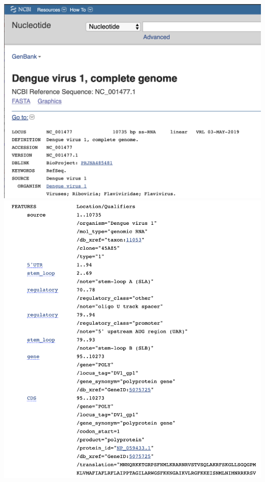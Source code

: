 \documentclass[landscape]{slides}
\begin{document}
\begin{slide}
\begin{center}

\includegraphics[width=6in]{figs/ss-001477-top}
\includegraphics[width=6in]{figs/ss-001477-mid}

\end{center}
\end{slide}
\end{document}

